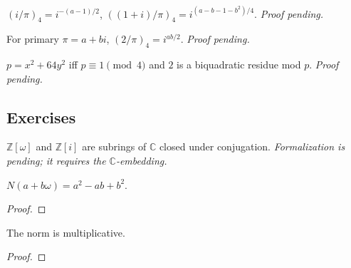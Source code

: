 \begin{lemma}
  \label{lem:biquadratic_supplementary}
  \leanok
  \notready
  $(i/\pi)_4 = i^{-(a-1)/2}$, $((1+i)/\pi)_4 = i^{(a-b-1-b^2)/4}$. \emph{Proof pending.}
\end{lemma}

\begin{theorem}
  \label{thm:quartic_char_two}
  \leanok
  \notready
  For primary $\pi = a+bi$, $(2/\pi)_4 = i^{ab/2}$. \emph{Proof pending.}
\end{theorem}

\begin{theorem}[$p = x^2 + 64y^2$; Cox Thm 4.23(ii)]
  \label{thm:x2_64y2}
  \leanok
  \notready
  $p = x^2 + 64y^2$ iff $p \equiv 1 \pmod 4$ and $2$ is a biquadratic residue mod
  $p$. \emph{Proof pending.}
\end{theorem}

\subsection{Exercises}

\begin{theorem}[Exercise 4.1]
  \label{exr:s4_1}
  \notready
  $\mathbb Z[\omega]$ and $\mathbb Z[i]$ are subrings of $\mathbb C$ closed under
  conjugation. \emph{Formalization is pending; it requires the $\mathbb C$-embedding.}
\end{theorem}

\begin{theorem}[Exercise 4.2(i)]
  \label{exr:s4_2_a}
  \leanok
  $N(a+b\omega) = a^2 - ab + b^2$.
\end{theorem}
\begin{proof}\leanok\end{proof}

\begin{theorem}[Exercise 4.2(ii)]
  \label{exr:s4_2_b}
  \leanok
  The norm is multiplicative.
\end{theorem}
\begin{proof}\leanok\end{proof}

